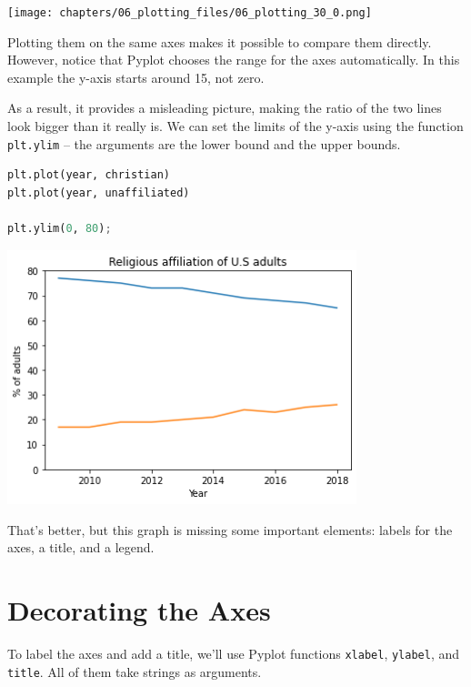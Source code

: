 \begin{center}
\texttt{[image: chapters/06\_plotting\_files/06\_plotting\_30\_0.png]}
\end{center}

Plotting them on the same axes makes it possible to compare them
directly. However, notice that Pyplot chooses the range for the axes
automatically. In this example the y-axis starts around 15, not zero.

As a result, it provides a misleading picture, making the ratio of the
two lines look bigger than it really is. We can set the limits of the
y-axis using the function \passthrough{\lstinline!plt.ylim!} -- the
arguments are the lower bound and the upper bounds.

\begin{lstlisting}[language=Python,style=source]
plt.plot(year, christian)
plt.plot(year, unaffiliated)

plt.ylim(0, 80);
\end{lstlisting}

\begin{center}
\includegraphics[width=4in]{chapters/06_plotting_files/06_plotting_32_0.png}
\end{center}

That's better, but this graph is missing some important elements: labels
for the axes, a title, and a legend.

\section{Decorating the Axes}\label{decorating-the-axes}

To label the axes and add a title, we'll use Pyplot functions
\passthrough{\lstinline!xlabel!}, \passthrough{\lstinline!ylabel!}, and
\passthrough{\lstinline!title!}. All of them take strings as arguments.

